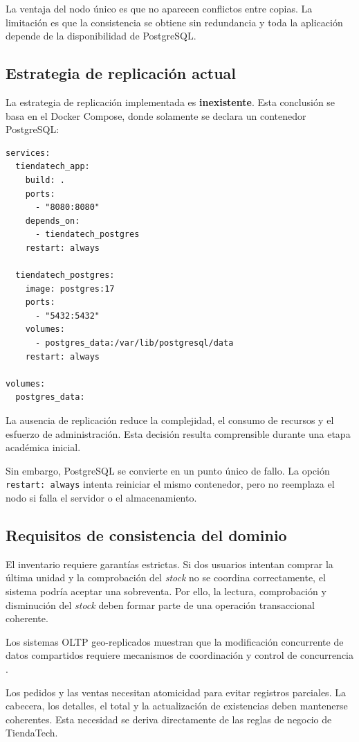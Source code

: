 \documentclass[11pt,a4paper]{article}
\begin{document}
La ventaja del nodo único es que no aparecen conflictos entre copias. La limitación es que la consistencia se obtiene sin redundancia y toda la aplicación depende de la disponibilidad de PostgreSQL.

\subsection{Estrategia de replicación actual}
La estrategia de replicación implementada es \textbf{inexistente}. Esta conclusión se basa en el Docker Compose, donde solamente se declara un contenedor PostgreSQL:

\begin{lstlisting}[caption={Fragmento representativo del Docker Compose de TiendaTech}, label={lst:compose}]
services:
  tiendatech_app:
    build: .
    ports:
      - "8080:8080"
    depends_on:
      - tiendatech_postgres
    restart: always

  tiendatech_postgres:
    image: postgres:17
    ports:
      - "5432:5432"
    volumes:
      - postgres_data:/var/lib/postgresql/data
    restart: always

volumes:
  postgres_data:
\end{lstlisting}

La ausencia de replicación reduce la complejidad, el consumo de recursos y el esfuerzo de administración. Esta decisión resulta comprensible durante una etapa académica inicial.

Sin embargo, PostgreSQL se convierte en un punto único de fallo. La opción \texttt{restart: always} intenta reiniciar el mismo contenedor, pero no reemplaza el nodo si falla el servidor o el almacenamiento.

\subsection{Requisitos de consistencia del dominio}
El inventario requiere garantías estrictas. Si dos usuarios intentan comprar la última unidad y la comprobación del \textit{stock} no se coordina correctamente, el sistema podría aceptar una sobreventa. Por ello, la lectura, comprobación y disminución del \textit{stock} deben formar parte de una operación transaccional coherente.

Los sistemas OLTP geo-replicados muestran que la modificación concurrente de datos compartidos requiere mecanismos de coordinación y control de concurrencia \cite{zhou2023}.

Los pedidos y las ventas necesitan atomicidad para evitar registros parciales. La cabecera, los detalles, el total y la actualización de existencias deben mantenerse coherentes. Esta necesidad se deriva directamente de las reglas de negocio de TiendaTech.
\end{document}
